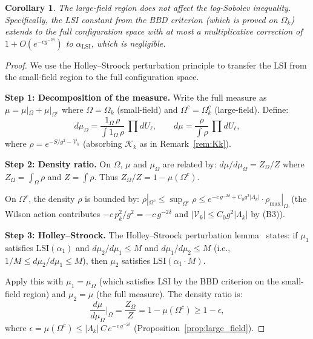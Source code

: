 \documentclass[11pt,a4paper]{article}
\theoremstyle{plain}
\newtheorem{corollary}[theorem]{Corollary}
\theoremstyle{definition}
\theoremstyle{remark}
\newcommand{\cV}{\mathcal{V}}
\newcommand{\cK}{\mathcal{K}}
\begin{document}
\begin{corollary}\label{cor:large_field_lsi}
The large-field region does not affect the log-Sobolev
inequality. Specifically, the LSI constant from the
BBD criterion (which is proved on $\Omega_k$)
extends to the full configuration space with at most
a multiplicative correction of $1 + O(e^{-c g^{-2\delta}})$
to $\alpha_{\mathrm{LSI}}$, which is negligible.
\end{corollary}

\begin{proof}
We use the Holley--Stroock perturbation principle to
transfer the LSI from the small-field region to the
full configuration space.

\medskip\noindent
\textbf{Step 1: Decomposition of the measure.}
Write the full measure as $\mu = \mu|_\Omega + \mu|_{\Omega^c}$
where $\Omega = \Omega_k$ (small-field) and
$\Omega^c = \Omega_k^c$ (large-field). Define:
\begin{equation}
  d\mu_\Omega = \frac{1_\Omega\,\rho}{\int 1_\Omega\,\rho}\,
  \prod dU_\ell, \qquad
  d\mu = \frac{\rho}{\int\rho}\,\prod dU_\ell,
\end{equation}
where $\rho = e^{-S/g^2 - \cV_k}$ (absorbing $\cK_k$ as
in Remark~\ref{rem:Kk}).

\medskip\noindent
\textbf{Step 2: Density ratio.}
On $\Omega$, $\mu$ and $\mu_\Omega$ are related by:
$d\mu/d\mu_\Omega = Z_\Omega / Z$ where
$Z_\Omega = \int_\Omega \rho$ and $Z = \int \rho$.
Thus $Z_\Omega/Z = 1 - \mu(\Omega^c)$.

On $\Omega^c$, the density $\rho$ is bounded by:
$\rho|_{\Omega^c} \le \sup_{\Omega^c}\rho
\le e^{-c\,g^{-2\delta} + C_0 g^2|\Lambda_k|}
\cdot \rho_{\max}|_\Omega$
(the Wilson action contributes $-c\,p_k^2/g^2
= -c\,g^{-2\delta}$ and $|\cV_k| \le C_0 g^2|\Lambda_k|$
by (B3)).

\medskip\noindent
\textbf{Step 3: Holley--Stroock.}
The Holley--Stroock perturbation lemma~\cite{HolleyStroock}
states: if $\mu_1$ satisfies $\mathrm{LSI}(\alpha_1)$ and
$d\mu_2/d\mu_1 \le M$ and $d\mu_1/d\mu_2 \le M$
(i.e., $1/M \le d\mu_2/d\mu_1 \le M$), then $\mu_2$
satisfies $\mathrm{LSI}(\alpha_1 \cdot M)$.

Apply this with $\mu_1 = \mu_\Omega$ (which satisfies
LSI by the BBD criterion on the small-field region)
and $\mu_2 = \mu$ (the full measure). The density
ratio is:
\begin{equation}
  \frac{d\mu}{d\mu_\Omega}\bigg|_\Omega = \frac{Z_\Omega}{Z}
  = 1 - \mu(\Omega^c) \ge 1 - \epsilon,
\end{equation}
where $\epsilon = \mu(\Omega^c)
\le |\Lambda_k|\,C\,e^{-c\,g^{-2\delta}}$
(Proposition~\ref{prop:large_field}).


\end{proof}
\end{document}

